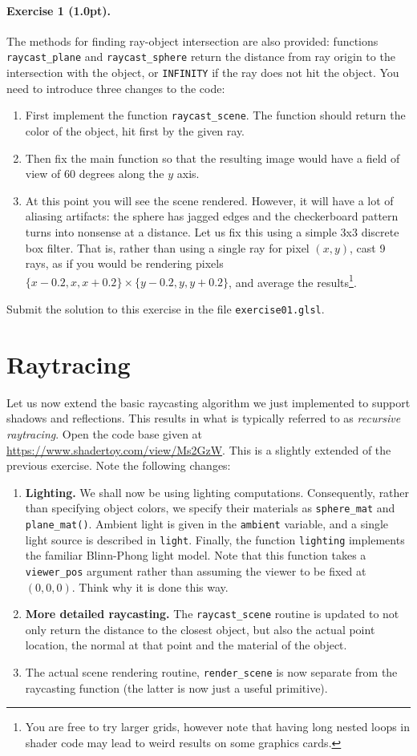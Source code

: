 \documentclass{article}
\newenvironment{exercise}[2]{\paragraph{Exercise #1 (#2pt).} }{
\medskip}
\begin{document}
\begin{exercise}{1}{1.0}
The methods for finding ray-object intersection are also provided: functions \verb#raycast_plane# and \verb#raycast_sphere# return the distance from ray origin to the intersection with the object, or \verb#INFINITY# if the ray does not hit the object. You need to introduce three changes to the code:
\begin{enumerate}
\item First implement the function \verb#raycast_scene#. The function should return the color of the object, hit first by the given ray.
\item Then fix the main function so that the resulting image would have a field of view of 60 degrees along the $y$ axis.
\item At this point you will see the scene rendered. However, it will have a lot of aliasing artifacts: the sphere has jagged edges and the checkerboard pattern turns into nonsense at a distance. Let us fix this using a simple 3x3 discrete box filter. That is, rather than using a single ray for pixel $(x,y)$, cast 9 rays, as if you would be rendering pixels $\{x-0.2, x, x+0.2\}\times\{y-0.2, y, y+0.2\}$, and average the results\footnote{You are free to try larger grids, however note that having long nested loops in shader code may lead to weird results on some graphics cards.}. 
\end{enumerate}
Submit the solution to this exercise in the file \verb#exercise01.glsl#.
\end{exercise}

\section{Raytracing}
Let us now extend the basic raycasting algorithm we just implemented to support shadows and reflections. This results in what is typically referred to as \emph{recursive raytracing}. Open the code base given at \url{https://www.shadertoy.com/view/Ms2GzW}. This is a slightly extended of the previous exercise. Note the following changes:
\begin{enumerate}
\item \textbf{Lighting.}  We shall now be using lighting computations. Consequently, rather than specifying object colors, we specify their materials as \verb#sphere_mat# and \verb#plane_mat()#. Ambient light is given in the \verb#ambient# variable, and a single light source is described in \verb#light#.
Finally, the function \verb#lighting# implements the familiar Blinn-Phong light model. Note that this function takes a \verb#viewer_pos# argument rather than assuming the viewer to be fixed at $(0, 0, 0)$. Think why it is done this way.
\item \textbf{More detailed raycasting.} The \verb#raycast_scene# routine is updated to not only return the distance to the closest object, but also the actual point location, the normal at that point and the material of the object.
\item The actual scene rendering routine, \verb#render_scene# is now separate from the raycasting function (the latter is now just a useful primitive).
\end{enumerate}
\end{document}
